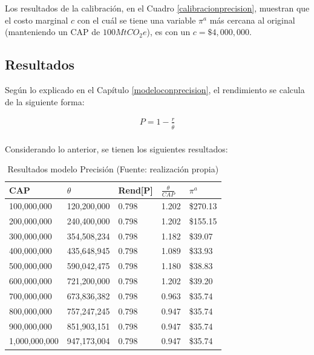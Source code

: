 Los resultados de la calibración, en el Cuadro \ref{calibracionprecision}, muestran que el costo marginal $c$ con el cuál se tiene una variable $\pi^a$ más cercana al original (manteniendo un CAP de $100MtCO_{2}e$), es con un $c=\$4,000,000$.

\subsection{Resultados}

Según lo explicado en el Capítulo \ref{modeloconprecision}, el rendimiento se calcula de la siguiente forma: 
\vspace{2.5mm}

\begin{equation}
\begin{array}{rrclcl}
\displaystyle P = 1- \frac{r}{\hat{\theta}} \\
\end{array}
\end{equation}

Considerando lo anterior, se tienen los siguientes resultados:

\begin{table}[H]
    \centering
    \begin{tabular}{|l|l|l|l|l|}
    \hline
        CAP & $\theta$ & Rend[P] & $\frac{\theta}{CAP}$  & $\pi^a$ \\ \hline
        100,000,000 & 120,200,000  & 0.798  & 1.202  &  \$270.13   \\ \hline
        200,000,000 & 240,400,000  & 0.798  & 1.202  &  \$155.15   \\ \hline
        300,000,000 & 354,508,234  & 0.798  & 1.182  &  \$39.07   \\ \hline
        400,000,000 & 435,648,945  & 0.798  & 1.089  &  \$33.93   \\ \hline
        500,000,000 & 590,042,475  & 0.798  & 1.180  &  \$38.83   \\ \hline
        600,000,000 & 721,200,000  & 0.798  & 1.202  &  \$39.20   \\ \hline
        700,000,000 & 673,836,382  & 0.798  & 0.963  &  \$35.74   \\ \hline
        800,000,000 & 757,247,245  & 0.798  & 0.947  &  \$35.74   \\ \hline
        900,000,000 & 851,903,151  & 0.798  & 0.947  &  \$35.74   \\ \hline
        1,000,000,000 & 947,173,004  & 0.798  & 0.947  &  \$35.74   \\ \hline
    \end{tabular}
    \caption{{\footnotesize Resultados modelo Precisión (Fuente: realización propia)}}
    \label{resultadosprecision}
\end{table}

